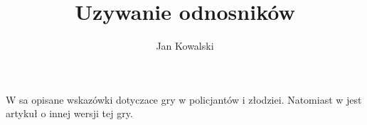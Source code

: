 \documentclass{article}
\author{Jan Kowalski}
\title{Uzywanie odnosników}
\begin{document}
\maketitle
\noindent
W \cite{small} sa opisane wskazówki dotyczace gry w policjantów i złodziei.
Natomiast w \cite{big} jest artykuł o innej wersji tej gry.
\newpage
\nocite{*}


\end{document}
